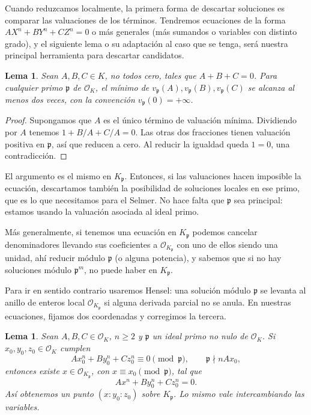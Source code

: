 \documentclass[a4paper]{book}
\theoremstyle{definition}
\theoremstyle{plain}
\newtheorem{lemma}[definition]{Lema}
\newcommand{\OO}{\mathcal{O}}
\newcommand{\pp}{\mathfrak{p}}
\begin{document}
Cuando reduzcamos localmente, la primera forma de descartar soluciones es comparar las valuaciones de los términos. Tendremos ecuaciones de la forma $AX^n+BY^n+CZ^n=0$ o más generales (más sumandos o variables con distinto grado), y el siguiente lema o su adaptación al caso que se tenga, será nuestra principal herramienta para descartar candidatos.

\begin{lemma}\label{lem:minimoValuaciones}
Sean $A,B,C\in K$, no todos cero, tales que $A+B+C=0$. Para cualquier primo $\pp$ de $\OO_K$, el mínimo de $v_\pp(A),v_\pp(B),v_\pp(C)$ se alcanza al menos dos veces, con la convención $v_\pp(0)=+\infty$.
\end{lemma}

\begin{proof}
Supongamos que $A$ es el único término de valuación mínima. Dividiendo por $A$ tenemos $1+B/A+C/A=0$. Las otras dos fracciones tienen valuación positiva en $\pp$, así que reducen a cero. Al reducir la igualdad queda $1=0$, una contradicción.
\end{proof}

El argumento es el mismo en $K_\pp$. Entonces, si las valuaciones hacen imposible la ecuación, descartamos también la posibilidad de soluciones locales en ese primo, que es lo que necesitamos para el Selmer. No hace falta que $\pp$ sea principal: estamos usando la valuación asociada al ideal primo.

Más generalmente, si tenemos una ecuación en $K_\pp$ podemos cancelar denominadores llevando sus coeficientes a $\OO_{K_\pp}$ con uno de ellos siendo una unidad, ahí reducir módulo $\pp$ (o alguna potencia), y sabemos que si no hay soluciones módulo $\pp^m$, no puede haber en $K_\pp$.

Para ir en sentido contrario usaremos Hensel: una solución módulo $\pp$ se levanta al anillo de enteros local $\OO_{K_\pp}$ si alguna derivada parcial no se anula. En nuestras ecuaciones, fijamos dos coordenadas y corregimos la tercera.

\begin{lemma}
Sean $A,B,C\in\OO_K$, $n\geq2$ y $\pp$ un ideal primo no nulo de $\OO_K$. Si $x_0,y_0,z_0\in\OO_K$ cumplen
\[
Ax_0^n+By_0^n+Cz_0^n\equiv0\pmod\pp,
\qquad \pp\nmid nAx_0,
\]
entonces existe $x\in\OO_{K_\pp}$, con $x\equiv x_0\pmod\pp$, tal que
\[
Ax^n+By_0^n+Cz_0^n=0.
\]
Así obtenemos un punto $(x:y_0:z_0)$ sobre $K_\pp$. Lo mismo vale intercambiando las variables.
\end{lemma}
\end{document}
